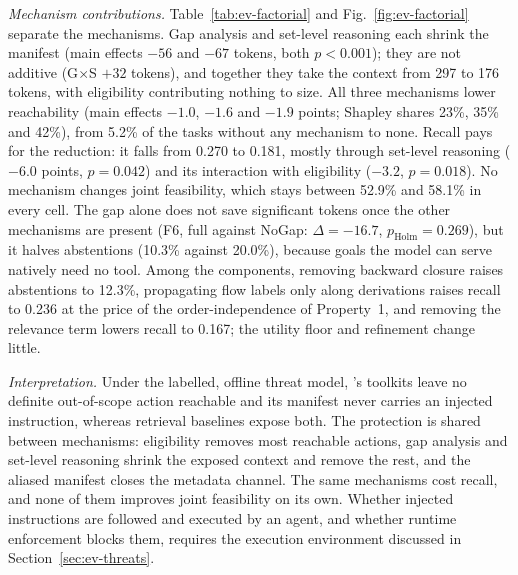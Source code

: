 \emph{Mechanism contributions.} Table~\ref{tab:ev-factorial} and Fig.~\ref{fig:ev-factorial} separate the
mechanisms. Gap analysis and set-level reasoning each shrink the manifest (main effects $-56$ and $-67$ tokens,
both $p<0.001$); they are not additive (G$\times$S $+32$ tokens), and together they take the context from 297 to
176 tokens, with eligibility contributing nothing to size. All three mechanisms lower reachability (main effects
$-1.0$, $-1.6$ and $-1.9$ points; Shapley shares 23\%, 35\% and 42\%), from 5.2\% of the tasks without any mechanism
to none. Recall pays for the reduction: it falls from 0.270 to 0.181, mostly through set-level reasoning
($-6.0$ points, $p=0.042$) and its interaction with eligibility ($-3.2$, $p=0.018$). No mechanism changes joint
feasibility, which stays between 52.9\% and 58.1\% in every cell. The gap alone does not save significant tokens
once the other mechanisms are present (F6, full against NoGap: $\Delta=-16.7$, $p_{\mathrm{Holm}}=0.269$), but
it halves abstentions (10.3\% against 20.0\%), because goals the model can serve natively need no tool. Among the
components, removing backward closure raises abstentions to 12.3\%, propagating flow labels only along
derivations raises recall to 0.236 at the price of the order-independence of Property~1, and removing the
relevance term lowers recall to 0.167; the utility floor and refinement change little.

\emph{Interpretation.} Under the labelled, offline threat model, \pamcp{}'s toolkits leave no definite
out-of-scope action reachable and its manifest never carries an injected instruction, whereas retrieval
baselines expose both. The protection is shared between mechanisms: eligibility removes most reachable actions,
gap analysis and set-level reasoning shrink the exposed context and remove the rest, and the aliased manifest
closes the metadata channel. The same mechanisms cost recall, and none of them improves joint feasibility on its
own. Whether injected instructions are followed and executed by an agent, and whether runtime enforcement
blocks them, requires the execution environment discussed in Section~\ref{sec:ev-threats}.
